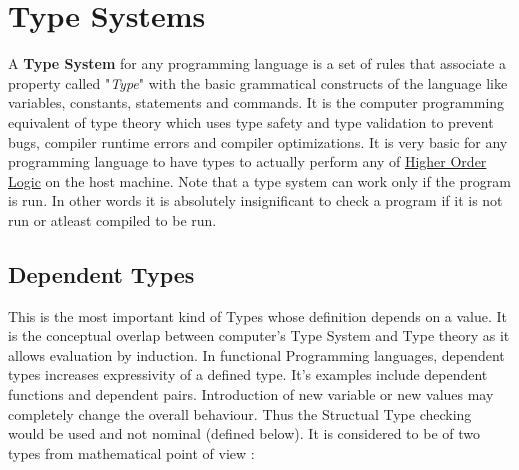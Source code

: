 \chapter{Type Systems}

A \textbf{Type System} for any programming language is a set of rules that associate a property called "\textit{Type}" with the basic grammatical constructs of the language like variables, constants, statements and commands. It is the computer programming equivalent of type theory which uses type safety and type validation to prevent bugs, compiler runtime errors and compiler optimizations. It is very basic for any programming language to have types to actually perform any of \underline{Higher Order Logic} on the host machine. Note that a type system can work only if the program is run. In other words it is absolutely insignificant to check a program if it is not run or atleast compiled to be run.\\


\section{Dependent Types}
This is the most important kind of Types whose definition depends on a value. It is the conceptual overlap between computer's Type System and Type theory as it allows evaluation by induction. In functional Programming languages, dependent types increases expressivity of a defined type. It's examples include dependent functions and dependent pairs. Introduction of new variable or new values may completely change the overall behaviour. Thus the Structual Type checking would be used and not nominal (defined below). It is considered to be of two types from mathematical point of view : \\

